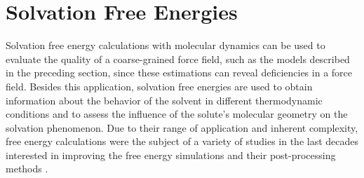 \section{Solvation Free Energies}

Solvation free energy calculations with molecular dynamics can be used to evaluate the quality of a coarse-grained force field, such as the models described in the preceding section, since these estimations can reveal deficiencies in a force field. Besides this application, solvation free energies are used to obtain information about the behavior of the solvent in different thermodynamic conditions and to assess the influence of the solute's molecular geometry on the solvation phenomenon. Due to their range of application and inherent complexity, free energy calculations were the subject of a variety of studies in the last decades interested in improving the free energy simulations and their post-processing methods \cite{mbar,bareva,dexp,gdel}.

